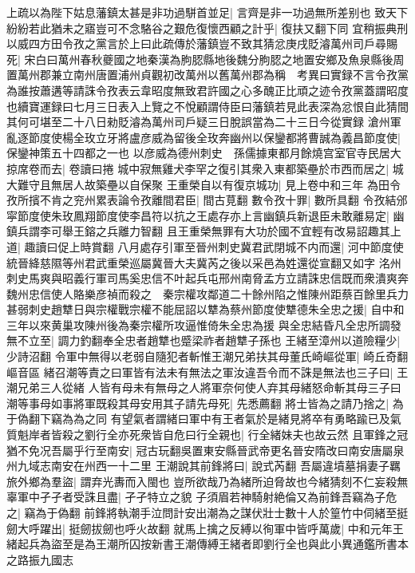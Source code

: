 上疏以為陛下姑息藩鎮太甚是非功過駢首並足|{
	言齊是非一功過無所差别也}
致天下紛紛若此猶未之寤豈可不念駱谷之艱危復懷西顧之計乎|{
	復扶又翻下同}
宜稍振典刑以威四方田令孜之黨言於上曰此疏傳於藩鎮豈不致其猜忿庚戌貶濬萬州司戶尋賜死|{
	宋白曰萬州春秋夔國之地秦漢為朐䏰縣地後魏分朐䏰之地置安鄉及魚泉縣後周置萬州郡兼立南州唐置浦州貞觀初改萬州以舊萬州郡為稱　考異曰實録不言令孜黨為誰按蕭遘等請誅令孜表云韋昭度無致君許國之心多醜正比頑之迹令孜黨蓋謂昭度也續寶運録曰七月三日表入上覽之不悅顧謂侍臣曰藩鎮若見此表深為忿恨自此猜間其何可堪至二十八日勑貶濬為萬州司戶疑三日脫誤當為二十三日今從實録}
滄州軍亂逐節度使楊全玫立牙將盧彦威為留後全玫奔幽州以保鑾都將曹誠為義昌節度使|{
	保鑾神策五十四都之一也}
以彦威為德州刺史　孫儒據東都月餘燒宫室官寺民居大掠席卷而去|{
	卷讀曰捲}
城中寂無雞犬李罕之復引其衆入東都築壘於市西而居之|{
	城大難守且無居人故築壘以自保聚}
王重榮自以有復京城功|{
	見上卷中和三年}
為田令孜所擯不肯之兖州累表論令孜離間君臣|{
	間古莧翻}
數令孜十罪|{
	數所具翻}
令孜結邠寜節度使朱玫鳳翔節度使李昌符以抗之王處存亦上言幽鎮兵新退臣未敢離易定|{
	幽鎮兵謂李可舉王鎔之兵離力智翻}
且王重榮無罪有大功於國不宜輕有改易詔趣其上道|{
	趣讀曰促上時賞翻}
八月處存引軍至晉州刺史冀君武閉城不内而還|{
	河中節度使統晉絳慈隰等州君武重榮巡屬冀晉大夫冀芮之後以采邑為姓還從宣翻又如字}
洺州刺史馬爽與昭義行軍司馬奚忠信不叶起兵屯邢州南脅孟方立請誅忠信既而衆潰爽奔魏州忠信使人賂樂彦禎而殺之　秦宗權攻鄰道二十餘州陷之惟陳州距蔡百餘里兵力甚弱刺史趙犨日與宗權戰宗權不能屈詔以犨為蔡州節度使犨德朱全忠之援|{
	自中和三年以來黄巢攻陳州後為秦宗權所攻逼惟倚朱全忠為援}
與全忠結昏凡全忠所調發無不立至|{
	調力釣翻奉全忠者趙犨也蹙梁祚者趙犨子孫也}
王緒至漳州以道險糧少|{
	少詩沼翻}
令軍中無得以老弱自隨犯者斬惟王潮兄弟扶其母董氏崎嶇從軍|{
	崎丘奇翻嶇音區}
緒召潮等責之曰軍皆有法未有無法之軍汝違吾令而不誅是無法也三子曰|{
	王潮兄弟三人從緒}
人皆有母未有無母之人將軍奈何使人弃其母緒怒命斬其母三子曰潮等事母如事將軍既殺其母安用其子請先母死|{
	先悉薦翻}
將士皆為之請乃捨之|{
	為于偽翻下竊為為之同}
有望氣者謂緒曰軍中有王者氣於是緒見將卒有勇略踰已及氣質魁岸者皆殺之劉行全亦死衆皆自危曰行全親也|{
	行全緒妹夫也故云然}
且軍鋒之冠猶不免况吾屬乎行至南安|{
	冠古玩翻吳置東安縣晉武帝更名晉安隋改曰南安唐屬泉州九域志南安在州西一十二里}
王潮說其前鋒將曰|{
	說式芮翻}
吾屬違墳墓捐妻子羈旅外鄉為羣盜|{
	謂弃光夀而入閩也}
豈所欲哉乃為緒所迫脅故也今緒猜刻不仁妄殺無辜軍中孑孑者受誅且盡|{
	孑孑特立之貌}
子須眉若神騎射絶倫又為前鋒吾竊為子危之|{
	竊為于偽翻}
前鋒將執潮手泣問計安出潮為之謀伏壯士數十人於篁竹中伺緒至挺劒大呼躍出|{
	挺劒拔劒也呼火故翻}
就馬上擒之反縛以徇軍中皆呼萬歲|{
	中和元年王緒起兵為盜至是為王潮所囚按新書王潮傳縛王緒者即劉行全也與此小異通鑑所書本之路振九國志}
